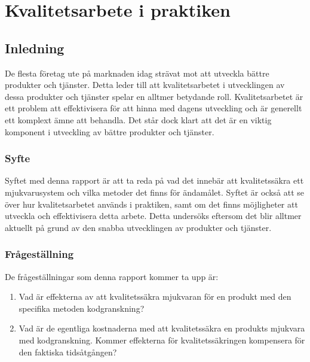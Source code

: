 \chapter{Kvalitetsarbete i praktiken}
\label{cha:indiv-report-wallstrom}


\section{Inledning}
\label{sec:introduction-wallstrom}

De flesta företag ute på marknaden idag strävat mot att utveckla bättre produkter och tjänster. Detta leder till att kvalitetsarbetet i utvecklingen av dessa produkter och tjänster spelar en alltmer betydande roll. Kvalitetsarbetet är ett problem att effektivisera för att hinna med dagens utveckling och är generellt ett komplext ämne att behandla. Det står dock klart att det är en viktig komponent i utveckling av bättre produkter och tjänster.

\subsection{Syfte}
\label{sec:purpose-wallstrom}

Syftet med denna rapport är att ta reda på vad det innebär att kvalitetssäkra ett mjukvarusystem och vilka metoder det finns för ändamålet. Syftet är också att se över hur kvalitetsarbetet används i praktiken, samt om det finns möjligheter att utveckla och effektivisera detta arbete. Detta undersöks eftersom det blir alltmer aktuellt på grund av den snabba utvecklingen av produkter och tjänster.

\subsection{Frågeställning}
\label{sec:issue-wallstrom}

De frågeställningar som denna rapport kommer ta upp är:

\begin{enumerate}
	\item Vad är effekterna av att kvalitetssäkra mjukvaran för en produkt med den specifika metoden kodgranskning?
	\item Vad är de egentliga kostnaderna med att kvalitetssäkra en produkts mjukvara med kodgranskning. Kommer effekterna för kvalitetssäkringen kompensera för den faktiska tidsåtgången?
\end{enumerate}

